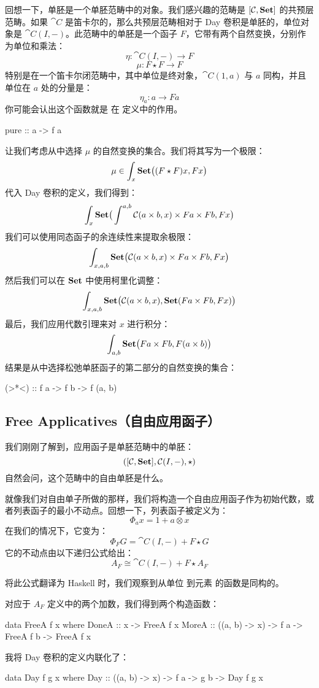 \documentclass[DaoFP]{subfiles}
\begin{document}
 回想一下，单胚是一个单胚范畴中的对象。我们感兴趣的范畴是 $[\mathcal{C}, \mathbf{Set}]$ 的共预层范畴。如果 $\cat C$ 是笛卡尔的，那么共预层范畴相对于 Day 卷积是单胚的，单位对象是 $\cat C(I, -)$。此范畴中的单胚是一个函子 $F$，它带有两个自然变换，分别作为单位和乘法：
 \[ \eta \colon \cat C(I, -) \to F \]
 \[ \mu \colon F \star F \to F \]
 特别是在一个笛卡尔闭范畴中，其中单位是终对象，$\cat C(1, a)$ 与 $a$ 同构，并且单位在 $a$ 处的分量是：
 \[ \eta_a \colon a \to F a \]
 你可能会认出这个函数就是  在  定义中的作用。
 \begin{haskell}
  pure :: a -> f a
 \end{haskell}

 让我们考虑从中选择 $\mu$ 的自然变换的集合。我们将其写为一个极限：
 \[ \mu \in \int_x \mathbf{Set} \big( (F \star F) x, F x \big) \]
 代入 Day 卷积的定义，我们得到：
 \[ \int_x \mathbf{Set} \big( \int^{a, b} \mathcal{C} (a \times b, x) \times F a \times  F b, F x \big) \]
 我们可以使用同态函子的余连续性来提取余极限：
 \[ \int_{x, a, b} \mathbf{Set} \big( \mathcal{C} (a \times b, x) \times F a \times  F b, F x \big) \]
 然后我们可以在 $\mathbf{Set}$ 中使用柯里化调整：
 \[ \int_{x, a, b} \mathbf{Set} \big( \mathcal{C} (a \times b, x),  \mathbf{Set}( F a \times  F b, F x) \big) \]
 最后，我们应用代数引理来对 $x$ 进行积分：
 \[ \int_{a, b}  \mathbf{Set} \big( F a \times  F b, F (a \times b) \big) \]
 结果是从中选择松弛单胚函子的第二部分的自然变换的集合：
 \begin{haskell}
 (>*<) :: f a -> f b -> f (a, b)
 \end{haskell}

 \subsection{Free Applicatives（自由应用函子）}

 我们刚刚了解到，应用函子是单胚范畴中的单胚：
 \[ ([\mathcal{C}, \mathbf{Set}], \mathcal{C}(I, -), \star) \]
 自然会问，这个范畴中的自由单胚是什么。

 就像我们对自由单子所做的那样，我们将构造一个自由应用函子作为初始代数，或者列表函子的最小不动点。回想一下，列表函子被定义为：
 \[ \Phi_a x = 1 + a \otimes x \]
 在我们的情况下，它变为：
 \[ \Phi_F G = \cat C(I, -) + F \star G \]
 它的不动点由以下递归公式给出：
 \[ A_F \cong \cat C(I, -) + F \star A_F\]

 将此公式翻译为 Haskell 时，我们观察到从单位  到元素  的函数是同构的。

 对应于 $A_F$ 定义中的两个加数，我们得到两个构造函数：
 \begin{haskell}
  data FreeA f x where
  DoneA :: x -> FreeA f x
  MoreA :: ((a, b) -> x) -> f a -> FreeA f b -> FreeA f x
 \end{haskell}
 我将 Day 卷积的定义内联化了：
 \begin{haskell}
  data Day f g x where
  Day :: ((a, b) -> x) -> f a -> g b -> Day f g x
 \end{haskell}
\end{document}
